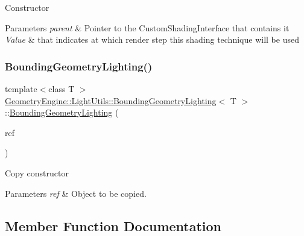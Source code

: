 Constructor 
\begin{DoxyParams}{Parameters}
{\em parent} & Pointer to the Custom\+Shading\+Interface that contains it \\
\hline
{\em Value} & that indicates at which render step this shading technique will be used \\
\hline
\end{DoxyParams}
\mbox{\label{class_geometry_engine_1_1_light_utils_1_1_bounding_geometry_lighting_aba6240594290eef979a9313a55eb9e3f}} 
\subsubsection{\texorpdfstring{BoundingGeometryLighting()}{BoundingGeometryLighting()}\hspace{0.1cm}{\footnotesize\ttfamily [2/2]}}
{\footnotesize\ttfamily template$<$class T $>$ \\
\mbox{\hyperlink{class_geometry_engine_1_1_light_utils_1_1_bounding_geometry_lighting}{Geometry\+Engine\+::\+Light\+Utils\+::\+Bounding\+Geometry\+Lighting}}$<$ T $>$\+::\mbox{\hyperlink{class_geometry_engine_1_1_light_utils_1_1_bounding_geometry_lighting}{Bounding\+Geometry\+Lighting}} (\begin{DoxyParamCaption}\item[{const \mbox{\hyperlink{class_geometry_engine_1_1_light_utils_1_1_light_render_component}{Light\+Render\+Component}} \&}]{ref }\end{DoxyParamCaption})\hspace{0.3cm}{\ttfamily [inline]}}

Copy constructor 
\begin{DoxyParams}{Parameters}
{\em ref} & Object to be copied. \\
\hline
\end{DoxyParams}


\subsection{Member Function Documentation}
\mbox{\label{class_geometry_engine_1_1_light_utils_1_1_bounding_geometry_lighting_af28cdecb60e4230898099d85245fb5c8}} 
